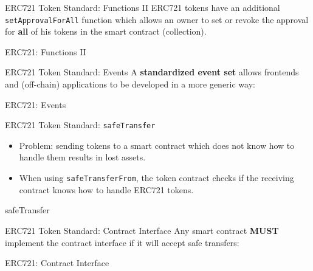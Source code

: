 \documentclass[handout]{beamer}
\begin{document}
\begin{frame}{ERC721 Token Standard: Functions II}
ERC721 tokens have an additional \texttt{setApprovalForAll} function which allows an owner to set or revoke the approval for \textbf{all} of his tokens in the smart contract (collection). 
\vspace{1em}
	\begin{samplecode}{ERC721: Functions II}
		
	\end{samplecode}
\end{frame}

\begin{frame}{ERC721 Token Standard: Events}
\vspace{0.5em}
	A \textbf{standardized event set} allows frontends and (off-chain) applications to be developed in a more generic way:
\vspace{1em}
	\begin{samplecode}{ERC721: Events}
		
	\end{samplecode}
\end{frame}

\begin{frame}{ERC721 Token Standard: \texttt{safeTransfer}}
\begin{itemize}
	\item Problem: sending tokens to a smart contract which does not know how to handle them results in lost assets.
	\item When using \texttt{safeTransferFrom}, the token contract checks if the receiving contract knows how to handle ERC721 tokens. 
\end{itemize}
\vspace{1em}
	\begin{samplecode}{safeTransfer}
		
	\end{samplecode}
\end{frame}


\begin{frame}{ERC721 Token Standard: Contract Interface}
\vspace{0.5em}
	Any smart contract \textbf{MUST} implement the contract interface if it will accept safe transfers:
\vspace{1em}
	\begin{samplecode}{ERC721: Contract Interface}
		
	\end{samplecode}
\end{frame}
\end{document}
